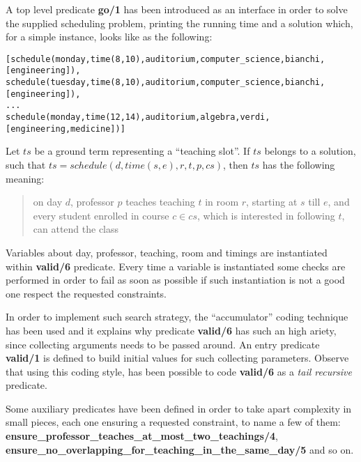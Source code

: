 \documentclass[10pt,a4paper]{article} %
\begin{document}
    A top level predicate \textbf{go/1} has been introduced as an interface in order
    to solve the supplied scheduling problem, printing the running time and a
    solution which, for a simple instance, looks like as the following:
    \begin{verbatim}
[schedule(monday,time(8,10),auditorium,computer_science,bianchi,[engineering]),
schedule(tuesday,time(8,10),auditorium,computer_science,bianchi,[engineering]),
...
schedule(monday,time(12,14),auditorium,algebra,verdi,[engineering,medicine])]
    \end{verbatim}
    Let $ts$ be a ground term representing a ``teaching slot''. If $ts$ belongs to a
    solution, such that $ts = schedule(d, time(s,e), r, t, p, cs)$,
    then $ts$ has the following meaning:
    \begin{quote}
        on day $d$, professor $p$ teaches teaching $t$ in room $r$,
        starting at $s$ till $e$, and every student enrolled in course $c \in cs$,
        which is interested in following $t$, can attend the class
    \end{quote}

    Variables about day, professor, teaching, room and timings
    are instantiated within \textbf{valid/6} predicate.
    Every time a variable is instantiated some
    checks are performed in order to fail as soon as possible if such
    instantiation is not a good one respect the requested constraints.

    In order to implement such search strategy, the ``accumulator''
    coding technique has been used and it explains why predicate \textbf{valid/6} has
    such an high ariety, since collecting arguments needs to be passed around.
    An entry predicate \textbf{valid/1} is defined to build
    initial values for such collecting parameters.
    Observe that using this coding style, has been
    possible to code \textbf{valid/6} as a \emph{tail recursive} predicate.

    Some auxiliary predicates have been defined in order to take apart
    complexity in small pieces, each one ensuring a requested constraint,
    to name a few of them: \textbf{ensure\_professor\_teaches\_at\_most\_two\_teachings/4},
    \textbf{ensure\_no\_overlapping\_for\_teaching\_in\_the\_same\_day/5} and so on.
\end{document}
